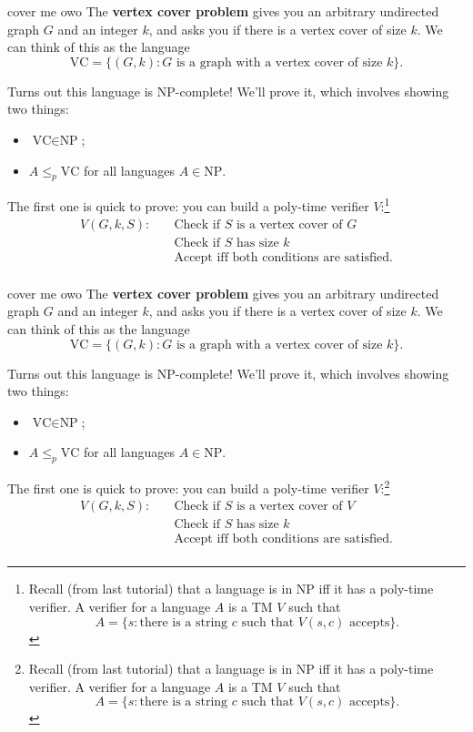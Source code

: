 \documentclass{beamer}
\begin{document}
\begin{frame}{cover me owo \emojiflushed}
The \textbf{vertex cover problem} gives you an arbitrary undirected graph $G$ and an integer $k$, and asks you if there is a vertex cover of size $k$. We can think of this as the language
$$\text{VC} = \{(G, k): \text{$G$ is a graph with a vertex cover of size $k$}\}.$$

Turns out this language is NP-complete! We'll prove it, which involves showing two things:
\begin{itemize}
\item $\text{VC}\in \text{NP}$;
\item $A \leq_p \text{VC}$ for all languages $A \in \text{NP}$.
\end{itemize}

The first one is quick to prove: you can build a poly-time verifier $V$:\footnote{
Recall (from last tutorial) that a language is in NP iff it has a poly-time verifier. A verifier for a language $A$ is a TM $V$ such that
$$A = \{s: \text{there is a string $c$ such that $V(s, c)$ accepts}\}.$$}
\begin{align*}
V(G, k, S): \quad &\text{Check if $S$ is a vertex cover of $G$}\\
&\text{Check if $S$ has size $k$}\\
&\text{Accept iff both conditions are satisfied.}\\
\end{align*}
\end{frame}

\begin{frame}{cover me owo \emojiflushed}
The \textbf{vertex cover problem} gives you an arbitrary undirected graph $G$ and an integer $k$, and asks you if there is a vertex cover of size $k$. We can think of this as the language
$$\text{VC} = \{(G, k): \text{$G$ is a graph with a vertex cover of size $k$}\}.$$

Turns out this language is NP-complete! We'll prove it, which involves showing two things:
\begin{itemize}
\item $\text{VC}\in \text{NP}$;
\item $A \leq_p \text{VC}$ for all languages $A \in \text{NP}$.
\end{itemize}

The first one is quick to prove: you can build a poly-time verifier $V$:\footnote{
Recall (from last tutorial) that a language is in NP iff it has a poly-time verifier. A verifier for a language $A$ is a TM $V$ such that
$$A = \{s: \text{there is a string $c$ such that $V(s, c)$ accepts}\}.$$}
\begin{align*}
V(G, k, S): \quad &\text{Check if $S$ is a vertex cover of $V$}\\
&\text{Check if $S$ has size $k$}\\
&\text{Accept iff both conditions are satisfied.}\\
\end{align*}
\end{frame}
\end{document}

